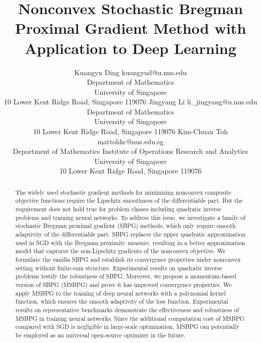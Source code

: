 \documentclass[twoside,11pt]{article}
\begin{document}
\title{Nonconvex Stochastic Bregman Proximal Gradient Method with Application to Deep Learning}

\author{\name Kuangyu Ding \email  kuangyud@u.nus.edu \\
       \addr Department of Mathematics\\
       University of Singapore\\
       10 Lower Kent Ridge Road, Singapore 119076
       \AND
       \name Jingyang Li \email  li\_jingyang@u.nus.edu \\
       \addr Department of Mathematics\\
       University of Singapore\\
       10 Lower Kent Ridge Road, Singapore 119076
       \AND
       \name Kim-Chuan Toh \email  mattohkc@nus.edu.sg \\
       \addr Department of Mathematics Institute of Operations Research and Analytics\\
       University of Singapore\\
       10 Lower Kent Ridge Road, Singapore 119076}


\editor{}


\maketitle

\begin{abstract}%
{The widely used stochastic gradient methods for minimizing nonconvex composite objective functions require the Lipschitz smoothness of the differentiable part. But the requirement} does not hold true for problem classes including quadratic inverse problems and training neural networks. 
To address this issue, we investigate a family of stochastic Bregman proximal gradient (SBPG) methods, which only require smooth adaptivity of the differentiable part. SBPG replaces the upper quadratic approximation used in SGD with the Bregman proximity measure, resulting in a better approximation model that captures the non-Lipschitz gradients of the nonconvex objective. We formulate the vanilla SBPG and establish its convergence properties under nonconvex setting without finite-sum structure. Experimental results on quadratic inverse problems testify the robustness of SBPG. Moreover, we propose a momentum-based version of SBPG (MSBPG) and prove it has improved convergence properties. We apply MSBPG to the training of deep neural networks with a polynomial kernel function, which ensures the smooth adaptivity of the loss function. Experimental results on representative benchmarks demonstrate the effectiveness and robustness of MSBPG in training neural networks. Since the additional computation cost of MSBPG compared with SGD is negligible in large-scale optimization, {
MSBPG can potentially be employed as an universal open-source optimizer in the future.}

\end{abstract}
\end{document}
